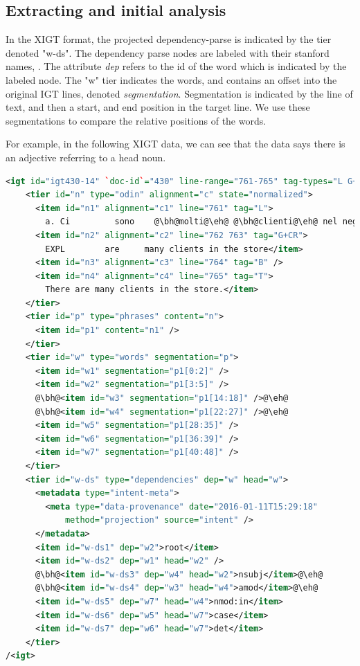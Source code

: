 \documentclass[]{article}
\begin{document}
\par
\subsection{Extracting and initial analysis}
In the XIGT format, the projected dependency-parse is indicated by the tier denoted "w-ds".  The dependency parse nodes are labeled with their stanford names, \cite{de2008stanford}.  The attribute \textit{dep} refers to the id of the word which is indicated by the labeled node.  The "w" tier indicates the words, and contains an offset into the original IGT lines, denoted \textit{segmentation}.  Segmentation is indicated by the line of text, and then a start, and end position in the target line.  We use these segmentations to compare the relative positions of the words.

For example, in the following XIGT data, we can see that the data says there is an adjective referring to a head noun.

\begin{lstlisting}[escapechar=@, language=XML, basicstyle=\sffamily, columns=fullflexible]
<igt id="igt430-14" `doc-id`="430" line-range="761-765" tag-types="L G+CR G+CR B T">
    <tier id="n" type="odin" alignment="c" state="normalized">
      <item id="n1" alignment="c1" line="761" tag="L">
        a. Ci         sono    @\bh@molti@\eh@ @\bh@clienti@\eh@ nel negozio.</item>
      <item id="n2" alignment="c2" line="762 763" tag="G+CR">
        EXPL        are     many clients in the store</item>
      <item id="n3" alignment="c3" line="764" tag="B" />
      <item id="n4" alignment="c4" line="765" tag="T">
        There are many clients in the store.</item>
    </tier>
    <tier id="p" type="phrases" content="n">
      <item id="p1" content="n1" />
    </tier>
    <tier id="w" type="words" segmentation="p">
      <item id="w1" segmentation="p1[0:2]" />
      <item id="w2" segmentation="p1[3:5]" />
      @\bh@<item id="w3" segmentation="p1[14:18]" />@\eh@
      @\bh@<item id="w4" segmentation="p1[22:27]" />@\eh@
      <item id="w5" segmentation="p1[28:35]" />
      <item id="w6" segmentation="p1[36:39]" />
      <item id="w7" segmentation="p1[40:48]" />
    </tier>
    <tier id="w-ds" type="dependencies" dep="w" head="w">
      <metadata type="intent-meta">
        <meta type="data-provenance" date="2016-01-11T15:29:18"
            method="projection" source="intent" />
      </metadata>
      <item id="w-ds1" dep="w2">root</item>
      <item id="w-ds2" dep="w1" head="w2" />
      @\bh@<item id="w-ds3" dep="w4" head="w2">nsubj</item>@\eh@
      @\bh@<item id="w-ds4" dep="w3" head="w4">amod</item>@\eh@
      <item id="w-ds5" dep="w7" head="w4">nmod:in</item>
      <item id="w-ds6" dep="w5" head="w7">case</item>
      <item id="w-ds7" dep="w6" head="w7">det</item>
    </tier>
/<igt>    
\end{lstlisting}
\end{document}
